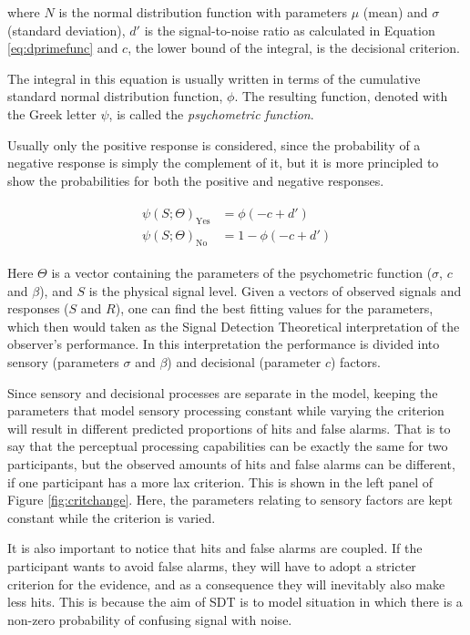 \documentclass{article}\usepackage{knitr}
\begin{document}
where $N$ is the normal distribution function with parameters $\mu$ (mean) and $\sigma$ (standard deviation), $d'$ is the signal-to-noise ratio as calculated in Equation \ref{eq:dprimefunc} and $c$, the lower bound of the integral, is the decisional criterion. 

The integral in this equation is usually written in terms of the cumulative standard normal distribution function, $\phi$. The resulting function, denoted with the Greek letter $\psi$, is called the \textit{psychometric function}. \cite[Chapter 4]{kingdomprins2010}

Usually only the positive response is considered, since the probability of a negative response is simply the complement of it, but it is more principled to show the probabilities for both the positive and negative responses. 

\begin{align*}
\begin{split}
\psi(S; \Theta)_{\text{Yes}} &= \phi(-c + d') \\
\psi(S; \Theta)_{\text{No}} &=  1 - \phi(-c + d')
\end{split}
\end{align*}

Here $\Theta$ is a vector containing the parameters of the psychometric function ($\sigma$, $c$ and $\beta$), and $S$ is the physical signal level. Given a vectors of observed signals and responses ($S$ and $R$), one can find the best fitting values for the parameters, which then would taken as the Signal Detection Theoretical interpretation of the observer's performance. In this interpretation the performance is divided into sensory (parameters $\sigma$ and $\beta$) and decisional (parameter $c$) factors.

Since sensory and decisional processes are separate in the model, keeping the parameters that model sensory processing constant while varying the criterion will result in different predicted proportions of hits and false alarms. That is to say that the perceptual processing capabilities can be exactly the same for two participants, but the observed amounts of hits and false alarms can be different, if one participant has a more lax criterion. This is shown in the left panel of Figure \ref{fig:critchange}. Here, the parameters relating to sensory factors are kept constant while the criterion is varied.

It is also important to notice that hits and false alarms are coupled. If the participant wants to avoid false alarms, they will have to adopt a stricter criterion for the evidence, and  as a consequence they  will inevitably also make less hits. This is because the aim of SDT is to model situation in which there is a non-zero probability of confusing signal with noise. 
\end{document}
